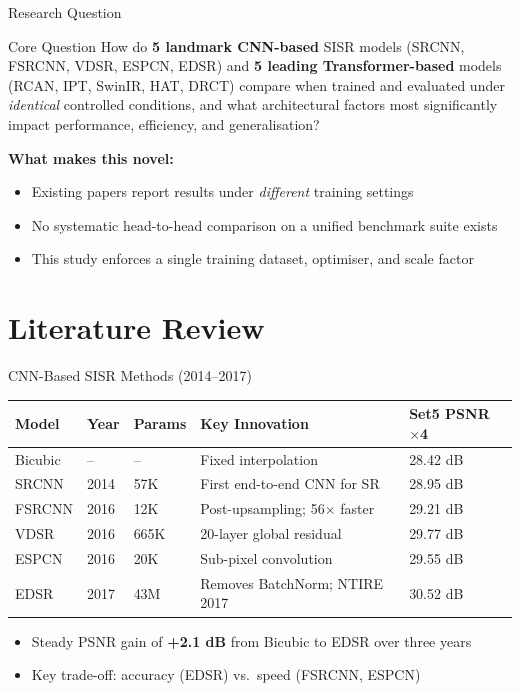 \documentclass[aspectratio=169]{beamer}
\begin{document}
\begin{frame}{Research Question}
  \begin{block}{Core Question}
    How do \textbf{5 landmark CNN-based} SISR models (SRCNN, FSRCNN, VDSR, ESPCN, EDSR) and \textbf{5 leading Transformer-based} models (RCAN, IPT, SwinIR, HAT, DRCT) compare when trained and evaluated under \emph{identical} controlled conditions, and what architectural factors most significantly impact performance, efficiency, and generalisation?
  \end{block}
  \vspace{8pt}
  \textbf{What makes this novel:}
  \begin{itemize}
    \item Existing papers report results under \emph{different} training settings
    \item No systematic head-to-head comparison on a unified benchmark suite exists
    \item This study enforces a single training dataset, optimiser, and scale factor
  \end{itemize}
\end{frame}

\section{Literature Review}

\begin{frame}{CNN-Based SISR Methods (2014–2017)}
  \begin{center}
  \small
  \begin{tabular}{@{}lllll@{}}
    \toprule
    \textbf{Model} & \textbf{Year} & \textbf{Params} & \textbf{Key Innovation} & \textbf{Set5 PSNR $\times$4} \\
    \midrule
    Bicubic   & --   & --    & Fixed interpolation            & 28.42 dB \\
    SRCNN     & 2014 & 57K   & First end-to-end CNN for SR    & 28.95 dB \\
    FSRCNN    & 2016 & 12K   & Post-upsampling; 56$\times$ faster & 29.21 dB \\
    VDSR      & 2016 & 665K  & 20-layer global residual       & 29.77 dB \\
    ESPCN     & 2016 & 20K   & Sub-pixel convolution          & 29.55 dB \\
    EDSR      & 2017 & 43M   & Removes BatchNorm; NTIRE 2017  & 30.52 dB \\
    \bottomrule
  \end{tabular}
  \end{center}
  \vspace{4pt}
  \begin{itemize}
    \item Steady PSNR gain of \textbf{+2.1 dB} from Bicubic to EDSR over three years
    \item Key trade-off: accuracy (EDSR) vs.\ speed (FSRCNN, ESPCN)
  \end{itemize}
\end{frame}
\end{document}
